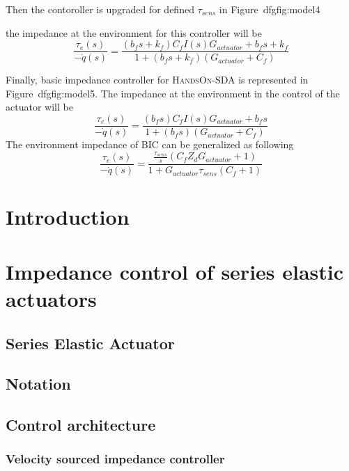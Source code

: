\documentclass{article}
\begin{document}
Then the contoroller is upgraded for defined $\tau_{sens}$ in Figure~dfgfig:model4

the impedance at the environment for this controller will be
\begin{equation}
\frac{\tau_e(s)}{-\Dot{q}(s)}=\frac{(b_fs+k_f)C_fI(s)G_{actuator}+b_fs+k_f}{1+(b_fs+k_f)(G_{actuator}+C_f)}   
\end{equation}

Finally, basic impedance controller for \textsc{HandsOn-SDA} is represented in Figure~dfgfig:model5. The impedance at the environment in the control of the actuator will be 
\begin{equation}
\frac{\tau_e(s)}{-\Dot{q}(s)}=\frac{(b_fs)C_fI(s)G_{actuator}+b_fs}{1+(b_fs)(G_{actuator}+C_f)}   
\end{equation}
The environment impedance of BIC can be generalized as following
\begin{equation}
\frac{\tau_e(s)}{-\Dot{q}(s)}=\frac{\frac{\tau_{sens}}{s}(C_fZ_{d}G_{actuator}+1)}{1+G_{actuator}\tau_{sens}(C_f+1)}   
\end{equation}










\maketitle

\section{Introduction}
\section{Impedance control of series elastic actuators}
\subsection{Series Elastic Actuator}
\subsection{Notation}
\subsection{Control architecture}
\subsubsection{Velocity sourced impedance controller}
\end{document}
